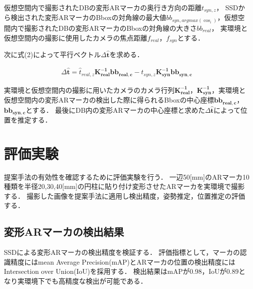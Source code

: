 \documentclass[a4j,twocolumn,10pt]{jarticle}
\begin{document}
仮想空間内で撮影されたDBの変形ARマーカの奥行き方向の距離$t_{syn,z}$，
SSDから検出された変形ARマーカのBboxの対角線の最大値$b b_{{syn},{argmax}\left(\cos _{i}\right)}$，仮想空間内で撮影されたDBの変形ARマーカのBboxの対角線の大きさ${b b_{real}}$，
実環境と仮想空間内の撮影に使用したカメラの焦点距離$f_{{real}}$，$f_{{syn}}$とする．\par 
次に式(2)によって平行ベクトル$\Delta \boldsymbol{\hat{t}}$を求める．

\vspace{-3.0zh}
\begin{eqnarray}
\label{sonsitu}
\Delta \boldsymbol{\hat{t}}=\hat{t}_{real,z} \boldsymbol{{K}_{real}^{-\mathbf{1}}} \boldsymbol{b} \boldsymbol{{b}_{real,c}}-t_{syn,z} \boldsymbol{{K}_{syn}^{-\mathbf{1}}} \boldsymbol{{b}} \boldsymbol{{b}_{syn,c}}
\end{eqnarray}
\vspace{-2.7zh}

実環境と仮想空間内の撮影に用いたカメラのカメラ行列$\boldsymbol{{K}_{real}^{-\mathbf{1}}}$，$\boldsymbol{{K}_{syn}^{-\mathbf{1}}}$，実環境と仮想空間内の変形ARマーカの検出した際に得られるBboxの中心座標$\boldsymbol{b} \boldsymbol{{b}_{real,c}}$，$\boldsymbol{{b}} \boldsymbol{{b}_{syn,c}}$とする．
最後にDB内の変形ARマーカの中心座標と求めた$\Delta \boldsymbol{\hat{t}}$によって位置を推定する．


\section{評価実験}
提案手法の有効性を確認するために評価実験を行う．
一辺50[mm]のARマーカ10種類を半径20,30,40[mm]の円柱に貼り付け変形させたARマーカを実環境で撮影する．
撮影した画像を提案手法に適用し検出精度，姿勢推定，位置推定の評価する．

\subsection{変形ARマーカの検出結果}
SSDによる変形ARマーカの検出精度を検証する．
評価指標として，マーカの認識精度にはmean Average Precision(mAP)とARマーカの位置の検出精度にはIntersection over Union(IoU)を採用する．
検出結果はmAPが0.98，IoUが0.89となり実環境下でも高精度な検出が可能である．
\end{document}
